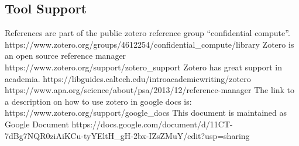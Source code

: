 \subsection{Tool Support}

References are part of the public zotero reference group  “confidential compute”.
https://www.zotero.org/groups/4612254/confidential_compute/library 
Zotero is an open source reference manager
https://www.zotero.org/support/zotero_support 
Zotero has great support in academia.
https://libguides.caltech.edu/introacademicwriting/zotero 
https://www.apa.org/science/about/psa/2013/12/reference-manager
The link to a description on how to use zotero in google docs is:
https://www.zotero.org/support/google_docs 
This document is maintained as Google Document
https://docs.google.com/document/d/11CT-7dBg7NQR0ziAiKCu-tyYEltH_gH-2bx-IZsZMuY/edit?usp=sharing


